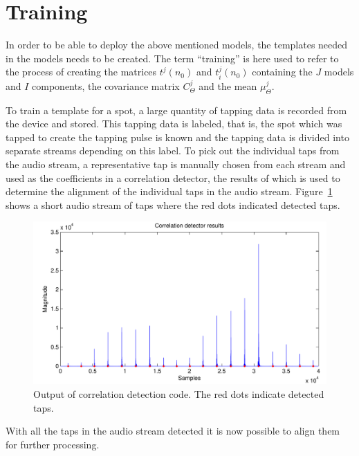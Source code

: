 \section{Training}\label{sec:APRtraining}
In order to be able to deploy the above mentioned models, the templates needed in the models needs to be created. The term ``training'' is here used to refer to the process of creating the matrices $t^j(n_0)$ and $t^j_i(n_0)$ containing the $J$ models and $I$ components, the covariance matrix $C^j_\Theta$ and the mean $\mu^j_\Theta$.

To train a template for a spot, a large quantity of tapping data is recorded from the device and stored. This tapping data is labeled, that is, the spot which was tapped to create the tapping pulse is known and the tapping data is divided into separate streams depending on this label. To pick out the individual taps from the audio stream, a representative tap is manually chosen from each stream and used as the coefficients in a correlation detector, the results of which is used to determine the alignment of the individual taps in the audio stream. Figure~\ref{fig:correlationDetect} shows a short audio stream of taps where the red dots indicated detected taps.

\begin{figure}[!]
\centering
\includegraphics[width=150mm]{correlationDetect.pdf}
\caption{Output of correlation detection code. The red dots indicate detected taps.}\label{fig:correlationDetect}
\end{figure}

With all the taps in the audio stream detected it is now possible to align them for further processing.

